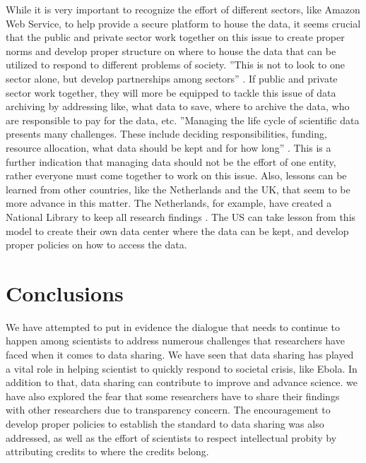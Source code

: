\documentclass[sigconf]{acmart}
\begin{document}
While it is very important to recognize the effort of different sectors, like Amazon Web Service, to help provide a secure platform to house the data, it seems crucial that the public and private sector work together on this issue to create proper norms and develop proper structure on where to house the data that can be utilized to respond to different problems of society. ''This is not to look to one sector alone, but develop partnerships among sectors'' \cite{berman2013will}. If public and private sector work together, they will more be equipped to tackle this issue of data archiving by addressing like, what data to save, where to archive the data, who are responsible to pay for the data, etc. ''Managing the life cycle of scientific data presents many challenges. These include deciding responsibilities, funding, resource allocation, what data should be kept and for how long'' \cite{lynch2008big}. This is a further indication that managing data should not be the effort of one entity, rather everyone must come together to work on this issue. Also, lessons can be learned from other countries, like the Netherlands and the UK, that seem to be more advance in this matter. The Netherlands, for example, have created a National Library to keep all research findings \cite{sarkol2016scientific}. The US can take lesson from this model to create their own data center where the data can be kept, and develop proper policies on how to access the data.



\section{Conclusions}

We have attempted to put in evidence the dialogue that needs to continue to happen among scientists to address numerous challenges that researchers have faced when it comes to data sharing. We have seen that data sharing has played a vital role in helping scientist to quickly respond to societal crisis, like Ebola. In addition to that, data sharing can contribute to improve and advance science. we have also explored the fear that some researchers have to share their findings with other researchers due to transparency concern. The encouragement to develop proper policies to establish the standard to data sharing was also addressed, as well as the effort of scientists to respect intellectual probity by attributing credits to where the credits belong. 




 
\end{document}
